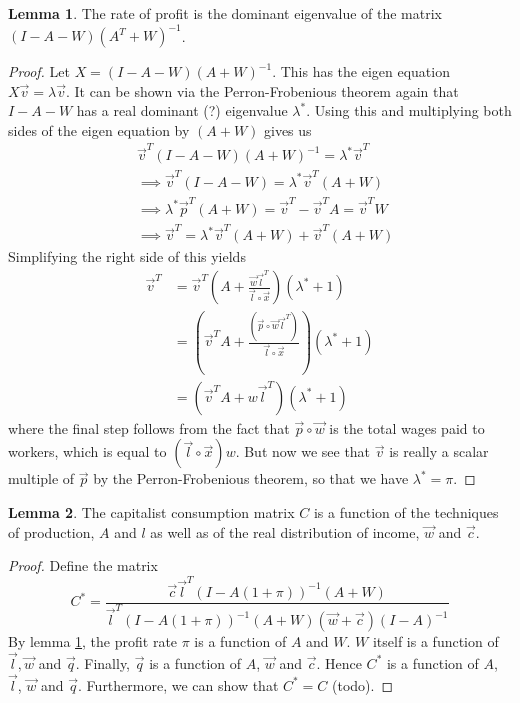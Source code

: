 \documentclass{article}
\theoremstyle{definition}
\newtheorem{lemma}{Lemma}[section]
\begin{document}
\begin{lemma}\label{abstract-nonsense}
    The rate of profit is the dominant eigenvalue of the matrix $(I-A-W)(A^T+W)^{-1}$.
\end{lemma}
\begin{proof}
    Let $X = (I-A-W)(A+W)^{-1}$. This has the eigen equation $X\vec{v} = \lambda \vec{v}$. It can be shown via the Perron-Frobenious theorem again that $I-A-W$ has a real dominant (?) eigenvalue $\lambda^*$. Using this and multiplying both sides of the eigen equation by $(A+W)$ gives us
    \begin{align}
        & \vec{v}^T(I-A-W)(A+W)^{-1} = \lambda^*\vec{v}^T \\
        &\implies \vec{v}^T(I-A-W)=\lambda^*\vec{v}^T(A+W) \\
        &\implies \lambda^* \vec{p}^T (A+W) = \vec{v}^T-\vec{v}^TA=\vec{v}^TW \\
        &\implies \vec{v}^T = \lambda^*\vec{v}^T(A+W)+\vec{v}^T(A+W)
    \end{align}
    Simplifying the right side of this yields
    \begin{align}
        \vec{v}^T &= \vec{v}^T(A+\frac{\vec{w}\vec{l}^T}{\vec{l}\circ \vec{x}})(\lambda^*+1) \\
                                               &= (\vec{v}^TA + \frac{(\vec{p}\circ \vec{w}\vec{l}^T)}{\vec{l}\circ \vec{x}})(\lambda^*+1) \\
                                               &= (\vec{v}^TA+w\vec{l}^T)(\lambda^*+1)
    \end{align}
    where the final step follows from the fact that $\vec{p}\circ\vec{w}$ is the total wages paid to workers, which is equal to $(\vec{l}\circ\vec{x})w$. But now we see that $\vec{v}$ is really a scalar multiple of $\vec{p}$ by the Perron-Frobenious theorem, so that we have $\lambda^* = \pi$.
\end{proof}

\begin{lemma}
    The capitalist consumption matrix $C$ is a function of the techniques of production, $A$ and $l$ as well as of the real distribution of income, $\vec{w}$ and $\vec{c}$. 
\end{lemma}

\begin{proof}
    Define the matrix 
    \begin{equation}
        C^* = \frac{\vec{c}\vec{l}^T(I-A(1+\pi))^{-1}(A+W)}{\vec{l}^T(I-A(1+\pi))^{-1}(A+W)(\vec{w}+\vec{c})(I-A)^{-1}}
    \end{equation}
    By lemma \ref{abstract-nonsense}, the profit rate $\pi$ is a function of $A$ and $W$. $W$ itself is a function of $\vec{l}, \vec{w}$ and $\vec{q}$. Finally, $\vec{q}$ is a function of $A$, $\vec{w}$ and $\vec{c}$. Hence $C^*$ is a function of $A$, $\vec{l}$, $\vec{w}$ and $\vec{q}$. Furthermore, we can show that $C^* = C$ (todo). 
\end{proof}
\end{document}

